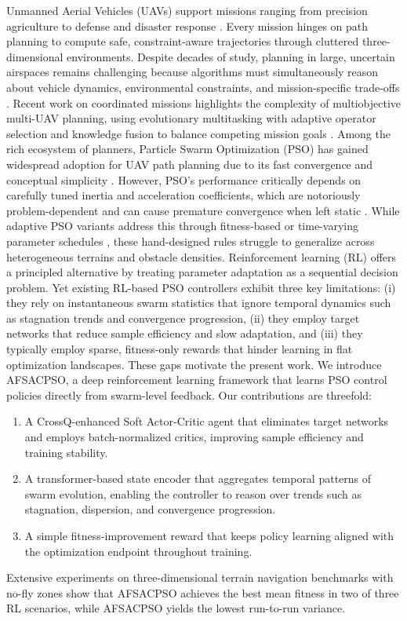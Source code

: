 \documentclass[final,5p,times]{elsarticle}
\begin{document}
\label{sec:intro} Unmanned Aerial Vehicles (UAVs) support missions ranging from precision agriculture to defense and disaster response \cite{Delavarpour2021A, Fascista2022Toward, Alotaibi2019LSAR}.
Every mission hinges on path planning to compute safe, constraint-aware trajectories through cluttered three-dimensional environments.
Despite decades of study, planning in large, uncertain airspaces remains challenging because algorithms must simultaneously reason about vehicle dynamics, environmental constraints, and mission-specific trade-offs \cite{AitSaadi2022UAV, Zhou2025A}.
Recent work on coordinated missions highlights the complexity of multiobjective multi-UAV planning, using evolutionary multitasking with adaptive operator selection and knowledge fusion to balance competing mission goals \cite{Meng2025Multiobjective}. Among the rich ecosystem of planners, Particle Swarm Optimization (PSO) \cite{Kennedy1995Particle} has gained widespread adoption for UAV path planning due to its fast convergence and conceptual simplicity \cite{Cheng2024Research}.
However, PSO's performance critically depends on carefully tuned inertia and acceleration coefficients, which are notoriously problem-dependent and can cause premature convergence when left static \cite{Yang2015Lowdiscrepancy}.
While adaptive PSO variants address this through fitness-based or time-varying parameter schedules \cite{Bansal2011Inertia, Liu2025A}, these hand-designed rules struggle to generalize across heterogeneous terrains and obstacle densities. Reinforcement learning (RL) offers a principled alternative by treating parameter adaptation as a sequential decision problem.
Yet existing RL-based PSO controllers exhibit three key limitations: (i) they rely on instantaneous swarm statistics that ignore temporal dynamics such as stagnation trends and convergence progression, (ii) they employ target networks that reduce sample efficiency and slow adaptation, and (iii) they typically employ sparse, fitness-only rewards that hinder learning in flat optimization landscapes.
These gaps motivate the present work. We introduce AFSACPSO, a deep reinforcement learning framework that learns PSO control policies directly from swarm-level feedback.
Our contributions are threefold:
\begin{enumerate} \item A CrossQ-enhanced Soft Actor-Critic agent that eliminates target networks and employs batch-normalized critics, improving sample efficiency and training stability. \item A transformer-based state encoder that aggregates temporal patterns of swarm evolution, enabling the controller to reason over trends such as stagnation, dispersion, and convergence progression. \item A simple fitness-improvement reward that keeps policy learning aligned with the optimization endpoint throughout training.
\end{enumerate} Extensive experiments on three-dimensional terrain navigation benchmarks with no-fly zones show that AFSACPSO achieves the best mean fitness in two of three RL scenarios, while AFSACPSO yields the lowest run-to-run variance.
\end{document}
